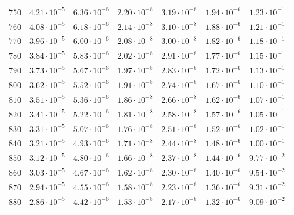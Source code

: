 \begin{table}
\begin{tabular}{lcccccc}
$750 $&$ 4.21\cdot 10^{-5}  $&$ 6.36\cdot 10^{-6}  $&$ 2.20\cdot 10^{-8}  $&$ 3.19\cdot 10^{-8}  $&$ 1.94\cdot 10^{-6}  $&$ 1.23\cdot 10^{-1}  $\\
$760 $&$ 4.08\cdot 10^{-5}  $&$ 6.18\cdot 10^{-6}  $&$ 2.14\cdot 10^{-8}  $&$ 3.10\cdot 10^{-8}  $&$ 1.88\cdot 10^{-6}  $&$ 1.21\cdot 10^{-1}  $\\
$770 $&$ 3.96\cdot 10^{-5}  $&$ 6.00\cdot 10^{-6}  $&$ 2.08\cdot 10^{-8}  $&$ 3.00\cdot 10^{-8}  $&$ 1.82\cdot 10^{-6}  $&$ 1.18\cdot 10^{-1}  $\\
$780 $&$ 3.84\cdot 10^{-5}  $&$ 5.83\cdot 10^{-6}  $&$ 2.02\cdot 10^{-8}  $&$ 2.91\cdot 10^{-8}  $&$ 1.77\cdot 10^{-6}  $&$ 1.15\cdot 10^{-1}  $\\
$790 $&$ 3.73\cdot 10^{-5}  $&$ 5.67\cdot 10^{-6}  $&$ 1.97\cdot 10^{-8}  $&$ 2.83\cdot 10^{-8}  $&$ 1.72\cdot 10^{-6}  $&$ 1.13\cdot 10^{-1}  $\\
$800 $&$ 3.62\cdot 10^{-5}  $&$ 5.52\cdot 10^{-6}  $&$ 1.91\cdot 10^{-8}  $&$ 2.74\cdot 10^{-8}  $&$ 1.67\cdot 10^{-6}  $&$ 1.10\cdot 10^{-1}  $\\
$810 $&$ 3.51\cdot 10^{-5}  $&$ 5.36\cdot 10^{-6}  $&$ 1.86\cdot 10^{-8}  $&$ 2.66\cdot 10^{-8}  $&$ 1.62\cdot 10^{-6}  $&$ 1.07\cdot 10^{-1}  $\\
$820 $&$ 3.41\cdot 10^{-5}  $&$ 5.22\cdot 10^{-6}  $&$ 1.81\cdot 10^{-8}  $&$ 2.58\cdot 10^{-8}  $&$ 1.57\cdot 10^{-6}  $&$ 1.05\cdot 10^{-1}  $\\
$830 $&$ 3.31\cdot 10^{-5}  $&$ 5.07\cdot 10^{-6}  $&$ 1.76\cdot 10^{-8}  $&$ 2.51\cdot 10^{-8}  $&$ 1.52\cdot 10^{-6}  $&$ 1.02\cdot 10^{-1}  $\\
$840 $&$ 3.21\cdot 10^{-5}  $&$ 4.93\cdot 10^{-6}  $&$ 1.71\cdot 10^{-8}  $&$ 2.44\cdot 10^{-8}  $&$ 1.48\cdot 10^{-6}  $&$ 1.00\cdot 10^{-1}  $\\
$850 $&$ 3.12\cdot 10^{-5}  $&$ 4.80\cdot 10^{-6}  $&$ 1.66\cdot 10^{-8}  $&$ 2.37\cdot 10^{-8}  $&$ 1.44\cdot 10^{-6}  $&$ 9.77\cdot 10^{-2}  $\\
$860 $&$ 3.03\cdot 10^{-5}  $&$ 4.67\cdot 10^{-6}  $&$ 1.62\cdot 10^{-8}  $&$ 2.30\cdot 10^{-8}  $&$ 1.40\cdot 10^{-6}  $&$ 9.54\cdot 10^{-2}  $\\
$870 $&$ 2.94\cdot 10^{-5}  $&$ 4.55\cdot 10^{-6}  $&$ 1.58\cdot 10^{-8}  $&$ 2.23\cdot 10^{-8}  $&$ 1.36\cdot 10^{-6}  $&$ 9.31\cdot 10^{-2}  $\\
$880 $&$ 2.86\cdot 10^{-5}  $&$ 4.42\cdot 10^{-6}  $&$ 1.53\cdot 10^{-8}  $&$ 2.17\cdot 10^{-8}  $&$ 1.32\cdot 10^{-6}  $&$ 9.09\cdot 10^{-2}  $\\

\end{tabular}
\end{table}
